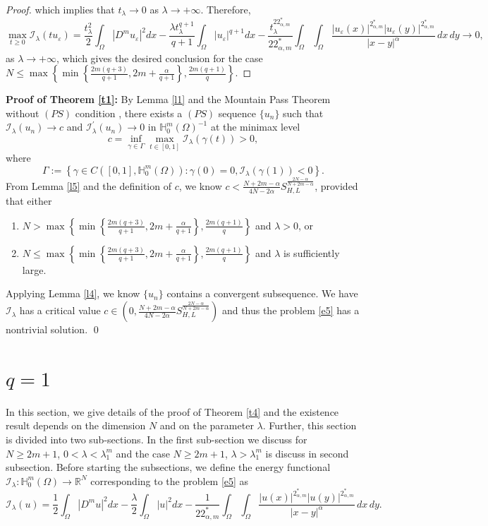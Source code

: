 \documentclass[reqno]{amsart}
\newcommand{\la} {\lambda}
\newcommand{\eps}{\varepsilon}
\newcommand{\Om}{\Omega}
\newcommand{\al} {\alpha}
\newcommand{\ga} {\gamma}
\newcommand{\noi} {  \noindent}
\newcommand{\mb} {\mathbb}
\newcommand{\mc} {\mathcal}
\numberwithin{theorem}{section} \numberwithin{equation}{section}
\begin{document}
\begin{proof}
which implies that $t_\la \rightarrow 0$ as $\la \rightarrow+\infty$. Therefore,
\[\max _{t \geq 0} \mc{I_\la}\left(t u_{\eps}\right)=\frac{t_\la^2}{2} \int_{\Om}\left|D^m u_{\eps}\right|^2 dx-\frac{\la t_\la^{q+1}}{q+1} \int_{\Om}\left|u_{\eps}\right|^{q+1} dx-\frac{t_\la^{22_{\al, m}^*}}{22_{\al, m}^*} \int_{\Om} \int_{\Om} \frac{\left|u_{\eps}(x)\right|^{2_{\al, m}^*}\left|u_{\eps}(y)\right|^{2_{\al, m}^*}}{|x-y|^\al} \, dx \, dy \rightarrow 0,\]
as $\la \rightarrow+\infty$, which gives the desired conclusion for the case $N \leq \max \left\{\min \left\{\frac{2m(q+3)}{q+1}, 2m+\frac{\al}{q+1}\right\}, \frac{2m(q+1)}{q}\right\}$.
\end{proof}
{\bf{\noi Proof of Theorem \ref{t1}:}}
By Lemma \ref{l1} and the Mountain Pass Theorem without $(PS)$ condition  \cite{4willem1996minimax}, there exists a $(PS)$ sequence $\{u_n\}$ such that $\mc{I_\la}(u_n) \rightarrow c$ and $\mc{I^{\prime}_\la}(u_n) \rightarrow 0$ in $\mb{H}_0^m(\Om)^{-1}$ at the minimax level
\[c=\inf _{\ga \in \Gamma} \max _{t \in[0,1]} \mc{I_\la}(\gamma(t))>0,\]
where
\[\Gamma:=\left\{\gamma \in C\left([0,1], \mb{H}_0^m(\Om)\right): \gamma(0)=0, \mc{I_\la}(\gamma(1))<0\right\}.\]
From Lemma \ref{l5} and the definition of $c$, we know
$c<\frac{N+2m-\al}{4N-2 \al} S_{H, L}^{\frac{2N-\al}{N+2m-\al}}$, provided that either
\begin{enumerate}
\item $N>\max \left\{\min \left\{\frac{2m(q+3)}{q+1}, 2m+\frac{\al}{q+1}\right\}, \frac{2m(q+1)}{q}\right\}$ and $\la>0$, or
\item $N \leq \max \left\{\min \left\{\frac{2m(q+3)}{q+1}, 2m+\frac{\al}{q+1}\right\}, \frac{2m(q+1)}{q}\right\}$ and $\la$ is sufficiently large.
\end{enumerate}
Applying Lemma \ref{l4}, we know $\{u_n\}$ contains a convergent subsequence. We have $\mc{I_\la}$ has a critical value 
$c \in\left(0, \frac{N+2m-\al}{4N-2\al} S_{H, L}^{\frac{2N-\al}{N+2m-\al}}\right)$ and thus the problem \eqref{e5} has a nontrivial solution.   \qed
\section{\bf{\texorpdfstring{$q=1$}{}}}
\noi In this section, we give details of the proof of Theorem \ref{t4} and the existence result depends on the dimension $N$ and on the parameter $\la$.
Further, this section is divided into two sub-sections. In the first sub-section we discuss for $N \geq 2m+1$, $0<{\la}<{\la}^m_1$ and the case $N \geq 2m+1$, ${\la}>{\la}^m_1$ is discuss in second subsection. Before starting the subsections, we define the energy functional $\mc{I_\la}:\mb{H}_0^{m}(\Om)\to \mb{R}^N$ corresponding to the problem \eqref{e5} as
\[\mc{I_\la}(u)= \frac{1}{2}\int_{\Om}|D^{m}u|^2 dx -\frac{\la}{2}\int_{\Om}|u|^2 dx-\frac{1}{22^*_{\al, m}}\int_{\Om}\int_{\Om} \frac{|u(x)|^{2_{\al, m}^{*}}|u(y)|^{2_{\al, m}^{*}}}{|x-y|^{\al}} \, dx \, dy.\]
\end{document}
